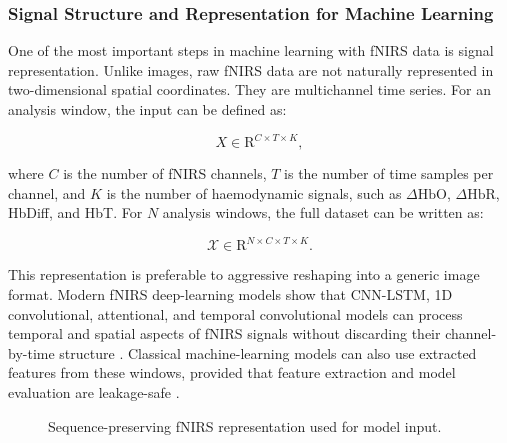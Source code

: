 \subsubsection{Signal Structure and Representation for Machine Learning}

One of the most important steps in machine learning with fNIRS data is signal representation. Unlike
images, raw fNIRS data are not naturally represented in two-dimensional spatial coordinates. They
are multichannel time series. For an analysis window, the input can be defined as:

\begin{equation}
X \in \mathrm{R}^{C \times T \times K},
\end{equation}

where \(C\) is the number of fNIRS channels, \(T\) is the number of time samples per channel, and
\(K\) is the number of haemodynamic signals, such as \(\Delta \mathrm{HbO}\), \(\Delta
\mathrm{HbR}\), HbDiff, and HbT. For \(N\) analysis windows, the full dataset can be written as:

\begin{equation}
\mathcal{X} \in \mathrm{R}^{N \times C \times T \times K}.
\end{equation}

This representation is preferable to aggressive reshaping into a generic image format. Modern fNIRS
deep-learning models show that CNN-LSTM, 1D convolutional, attentional, and temporal convolutional
models can process temporal and spatial aspects of fNIRS signals without discarding their
channel-by-time structure \cite{Khan2025,Qin2024,Eastmond2022}. Classical machine-learning models
can also use extracted features from these windows, provided that feature extraction and model
evaluation are leakage-safe \cite{Benerradi2023}.

\begin{figure}[h]
\centering
{}
\caption{Sequence-preserving fNIRS representation used for model input.}
\label{fig:temporal_representation}
\end{figure}

